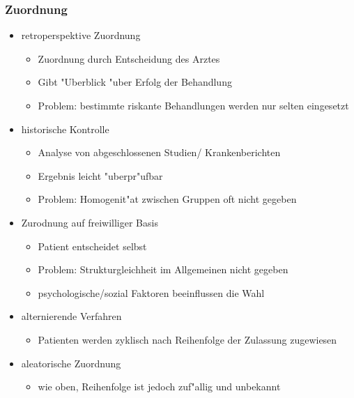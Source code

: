\documentclass{beamer}
\begin{document}
\begin{frame}
  \frametitle{Zuordnung}
  \begin{itemize}[<+->]
    \item retroperspektive Zuordnung 
      \begin{itemize}[<+->]
        \item Zuordnung durch Entscheidung des Arztes
        \item Gibt "Uberblick "uber Erfolg der Behandlung
        \item Problem: bestimmte riskante Behandlungen werden nur selten eingesetzt
      \end{itemize}
    \item historische Kontrolle
      \begin{itemize}[<+->]
        \item Analyse von abgeschlossenen Studien/ Krankenberichten
        \item Ergebnis leicht "uberpr"ufbar
        \item Problem: Homogenit"at zwischen Gruppen oft nicht gegeben
      \end{itemize}
    \item Zurodnung auf freiwilliger Basis
      \begin{itemize}[<+->]
        \item Patient entscheidet selbst
        \item Problem: Strukturgleichheit im Allgemeinen nicht gegeben
        \item psychologische/sozial Faktoren beeinflussen die Wahl
      \end{itemize}
    \item alternierende Verfahren
      \begin{itemize}[<+->]
        \item Patienten werden zyklisch nach Reihenfolge der Zulassung zugewiesen
      \end{itemize}
    \item aleatorische Zuordnung
      \begin{itemize}[<+->]
        \item wie oben, Reihenfolge ist jedoch zuf"allig und unbekannt
      \end{itemize}
  \end{itemize}
\end{frame}
\end{document}
